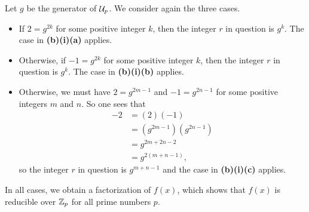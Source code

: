\begin{questions}
\begin{partquestions}{\alph*}
\begin{partquestions}{\roman*}
            \item Let $g$ be the generator of $\mathcal{U}_{p}$. We consider again the three cases.
            \begin{itemize}
                \item If $2 = g^{2k}$ for some positive integer $k$, then the integer $r$ in question is $g^k$. The case in \textbf{(b)(i)(a)} applies.
                \item Otherwise, if $-1 = g^{2k}$ for some positive integer $k$, then the integer $r$ in question is $g^k$. The case in \textbf{(b)(i)(b)} applies.
                \item Otherwise, we must have $2 = g^{2m - 1}$ and $-1 = g^{2n - 1}$ for some positive integers $m$ and $n$. So one sees that
                \begin{align*}
                    -2 &= (2)(-1)\\
                    &= \left(g^{2m-1}\right)\left(g^{2n-1}\right)\\
                    &= g^{2m+2n-2}\\
                    &= g^{2(m+n-1)},
                \end{align*}
                so the integer $r$ in question is $g^{m+n-1}$ and the case in \textbf{(b)(i)(c)} applies.
            \end{itemize}
            In all cases, we obtain a factorization of $f(x)$, which shows that $f(x)$ is reducible over $\mathbb{Z}_p$ for all prime numbers $p$.
        \end{partquestions}
    \end{partquestions}
\end{questions}
